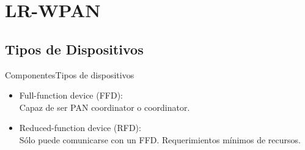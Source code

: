 \documentclass[aspectratio=169, handout]{beamer}
\begin{document}
\section{LR-WPAN}

\subsection[Dispositivos]{Tipos de Dispositivos}

\begin{frame}{Componentes}{Tipos de dispositivos}
\begin{minipage}[c]{1.0\linewidth}
	\begin{minipage}[c]{0.5\linewidth}
		\begin{itemize}
			\item Full-function device (FFD):\\ Capaz de ser PAN coordinator o coordinator. 
			\vspace{10px}
			\item Reduced-function device (RFD):\\ Sólo puede comunicarse con un FFD. Requerimientos mínimos de recursos.
	  	\end{itemize}	
	\end{minipage}	
	\begin{minipage}[c]{0.5\linewidth}
		\begin{figure}
			\begin{align*} 
				\hspace{15px} 
				\end{align*}\\
				\vspace{15px}
			
		\end{figure}	  	  	  	
	\end{minipage}	
\end{minipage}
\end{frame}
\end{document}
